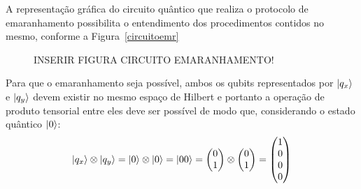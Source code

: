 A representação gráfica do circuito quântico que realiza o protocolo de emaranhamento possibilita o entendimento dos procedimentos contidos no mesmo, conforme a Figura~\ref{circuitoemr}

\begin{figure}[ht!]
  \centering
  \caption{INSERIR FIGURA CIRCUITO EMARANHAMENTO!}
\end{figure}

Para que o emaranhamento seja possível, ambos os qubits representados por $\ket{q_x}$ e $\ket{q_y}$ devem existir no mesmo espaço de Hilbert e portanto a operação de produto tensorial entre eles deve ser possível de modo que, considerando o estado quântico $\ket{0}$:
\begin{equation}
\ket{q_x} \otimes \ket{q_y} = \ket{0} \otimes \ket{0} = \ket{00} = \begin{pmatrix}
0 \\
1
\end{pmatrix} \otimes \begin{pmatrix}
0 \\
1
\end{pmatrix} = \begin{pmatrix}
1 \\
0 \\
0 \\
0
\end{pmatrix}
\end{equation}

